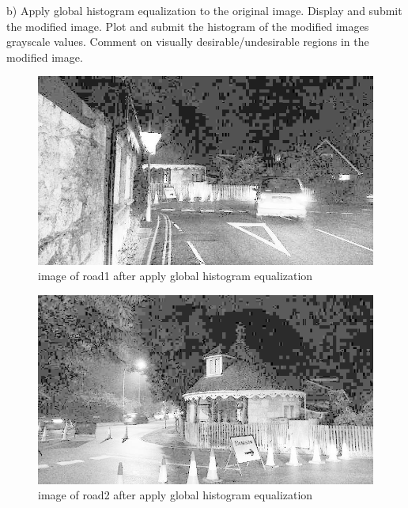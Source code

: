 \documentclass[
	12pt, %
]{fphw}
\begin{document}
\begin{problem}
	b)  Apply global histogram equalization to the original image. Display and submit the modified image. Plot
	and submit the histogram of the modified images grayscale values. Comment on visually desirable/undesirable
	regions in the modified image.
\end{problem}
\begin{figure}[H]
 
	\centering
	\includegraphics[width=1\columnwidth]{T2/result/I1_global.jpg} 
	\caption{image of road1 after apply global histogram equalization}
	\label{fig10}
\end{figure}
\begin{figure}[H]
 
	\centering
	\includegraphics[width=1\columnwidth]{T2/result/I2_global.jpg} 
	\caption{image of road2 after apply global histogram equalization}
	\label{fig11}
\end{figure}
\end{document}
